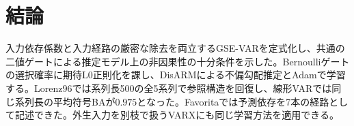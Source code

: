 \section{結論}
入力依存係数と入力経路の厳密な除去を両立するGSE-VARを定式化し、共通の二値ゲートによる推定モデル上の非因果性の十分条件を示した。Bernoulliゲートの選択確率に期待L0正則化を課し、DisARMによる不偏勾配推定とAdamで学習する。Lorenz96では系列長500の全5系列で参照構造を回復し、線形VARでは同じ系列長の平均符号BAが\(0.975\)となった。Favoritaでは予測依存を7本の経路として記述できた。外生入力を別枝で扱うVARXにも同じ学習方法を適用できる。
